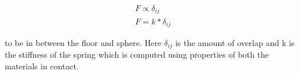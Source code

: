 \begin{align}
  \label{eq:linearForce}
  \label{eq1}F \propto \delta_{ij}\\
  \label{eq2}F = k * \delta_{ij}
\end{align}


to be in between the floor and sphere. Here $\delta_{ij}$ is the
amount of overlap and k is the stiffness of the spring which is
computed using properties of both the materials in contact.







